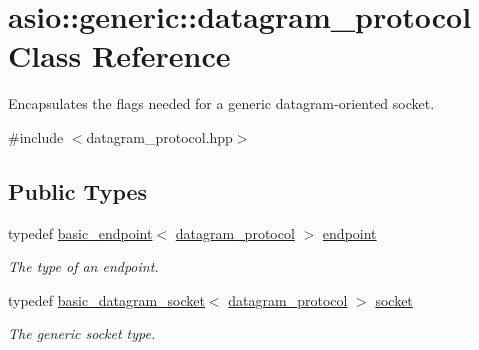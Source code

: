 \hypertarget{classasio_1_1generic_1_1datagram__protocol}{}\section{asio\+:\+:generic\+:\+:datagram\+\_\+protocol Class Reference}
\label{classasio_1_1generic_1_1datagram__protocol}


Encapsulates the flags needed for a generic datagram-\/oriented socket.  




{\ttfamily \#include $<$datagram\+\_\+protocol.\+hpp$>$}

\subsection*{Public Types}
\begin{DoxyCompactItemize}
\item 
typedef \hyperlink{classasio_1_1generic_1_1basic__endpoint}{basic\+\_\+endpoint}$<$ \hyperlink{classasio_1_1generic_1_1datagram__protocol}{datagram\+\_\+protocol} $>$ \hyperlink{classasio_1_1generic_1_1datagram__protocol_aa369f433faf2396705f94f287ae080b1}{endpoint}
\begin{DoxyCompactList}\small\item\em The type of an endpoint. \end{DoxyCompactList}\item 
typedef \hyperlink{classasio_1_1basic__datagram__socket}{basic\+\_\+datagram\+\_\+socket}$<$ \hyperlink{classasio_1_1generic_1_1datagram__protocol}{datagram\+\_\+protocol} $>$ \hyperlink{classasio_1_1generic_1_1datagram__protocol_ace3933da4ea5583139d643d17042b9f3}{socket}
\begin{DoxyCompactList}\small\item\em The generic socket type. \end{DoxyCompactList}\end{DoxyCompactItemize}
